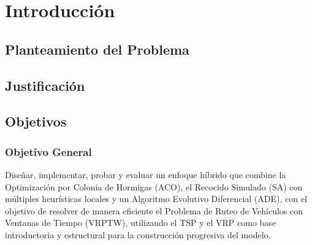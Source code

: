 \documentclass[12pt,titlepage,twoside,openright]{book}
\makeatletter
\def\cleardoublepage{\clearpage\if@twoside \ifodd\c@page\else
\hbox{}
\thispagestyle{empty}
\newpage
\if@twocolumn\hbox{}\newpage\fi\fi\fi}
\makeatother
\begin{document}

\setcounter{tocdepth}{3}
\setcounter{secnumdepth}{3}


\tableofcontents
\cleardoublepage
\listoffigures
{}
\cleardoublepage
\listoftables
{}
\cleardoublepage
\listofmyequations
{}
\cleardoublepage


\mainmatter
\pagestyle{fancy}
\fancyhf{}
\fancyhead[RO,LE]{\bfseries \thepage}
\fancyhead[LO]{\nouppercase{\rightmark}}
\fancyhead[RE]{\nouppercase{\leftmark}}
\fancyfoot{}

\setlength{\parindent}{0pt}
\setlength{\parskip}{1.5ex}

\newcommand{\tab}{\hspace*{1cm}}

\chapter{Introducción}
\label{cap:introduccion}

\section{Planteamiento del Problema}
\section{Justificación}

\section{Objetivos}
\subsection{Objetivo General}

Diseñar, implementar, probar y evaluar un enfoque híbrido que combine la Optimización por Colonia de Hormigas (ACO), el Recocido Simulado (SA) con múltiples heurísticas locales y un Algoritmo Evolutivo Diferencial (ADE), con el objetivo de resolver de manera eficiente el Problema de Ruteo de Vehículos con Ventanas de Tiempo (VRPTW), utilizando el TSP y el VRP como base introductoria y estructural para la construcción progresiva del modelo.
\end{document}
